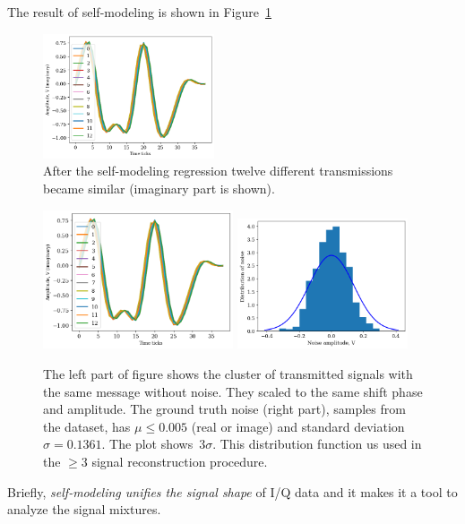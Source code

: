 \documentclass[12pt]{article}
\begin{document}
The result of self-modeling is shown in Figure~\ref{fig:cluster}
\begin{figure}[!tp]
\centering
\includegraphics[width=0.45\textwidth]{fig_cluster}
\caption{After the self-modeling regression twelve different transmissions became similar (imaginary part is shown).}
\label{fig:cluster}
\end{figure}
\begin{figure}[!h]
\centering
\includegraphics[width=0.5\textwidth]{fig_cluster}
\includegraphics[width=0.45\textwidth]{fig_noise_pdf}
\caption{The left part of figure shows the cluster of transmitted signals with the same message without noise. They scaled to the same shift phase and amplitude.  The ground truth noise (right part), samples from the dataset, has $\mu\leq 0.005$ (real or image) and standard deviation~$\sigma =  0.1361$. The plot shows~$3 \sigma$. This distribution function us used in the $\geq 3$ signal reconstruction procedure. }  %
\label{fig:demo}
\end{figure}

Briefly, \emph{self-modeling unifies the signal shape} of  I/Q data and it makes it a tool to analyze the signal mixtures. 
\end{document}
